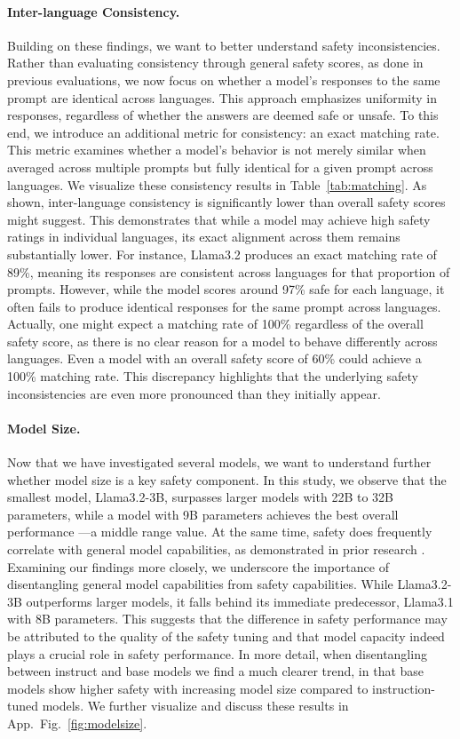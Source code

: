 \paragraph{Inter-language Consistency.} Building on these findings, we want to better understand safety inconsistencies. Rather than evaluating consistency through general safety scores, as done in previous evaluations, we now focus on whether a model’s responses to the same prompt are identical across languages. This approach emphasizes uniformity in responses, regardless of whether the answers are deemed safe or unsafe. To this end, we introduce an additional metric for consistency: an exact matching rate. 
This metric examines whether a model’s behavior is not merely similar when averaged across multiple prompts but fully identical for a given prompt across languages.
We visualize these consistency results in Table~\ref{tab:matching}. 
As shown, inter-language consistency is significantly lower than overall safety scores might suggest. This demonstrates that while a model may achieve high safety ratings in individual languages, its exact alignment across them remains substantially lower. For instance, Llama3.2 produces an exact matching rate of 89\%, meaning its responses are consistent across languages for that proportion of prompts. However, while the model scores around 97\% safe for each language, it often fails to produce identical responses for the same prompt across languages.
Actually, one might expect a matching rate of 100\% regardless of the overall safety score, as there is no clear reason for a model to behave differently across languages. Even a model with an overall safety score of 60\% could achieve a 100\% matching rate. This discrepancy highlights that the underlying safety inconsistencies are even more pronounced than they initially appear. 

\paragraph{Model Size.} Now that we have investigated several models, we want to understand further whether model size is a key safety component. In this study, we observe that the smallest model, Llama3.2-3B, surpasses larger models with 22B to 32B parameters, while a model with 9B parameters achieves the best overall performance ---a middle range value. At the same time, safety does frequently correlate with general model capabilities, as demonstrated in prior research \cite{ren2024safetywashingaisafetybenchmarks}. Examining our findings more closely, we underscore the importance of disentangling general model capabilities from safety capabilities. While Llama3.2-3B outperforms larger models, it falls behind its immediate predecessor, Llama3.1 with 8B parameters. This suggests that the difference in safety performance may be attributed to the quality of the safety tuning and that model capacity indeed plays a crucial role in safety performance. In more detail, when disentangling between instruct and base models we find a much clearer trend, in that base models show higher safety with increasing model size compared to instruction-tuned models. We further visualize and discuss these results in App.~Fig.~\ref{fig:modelsize}.

